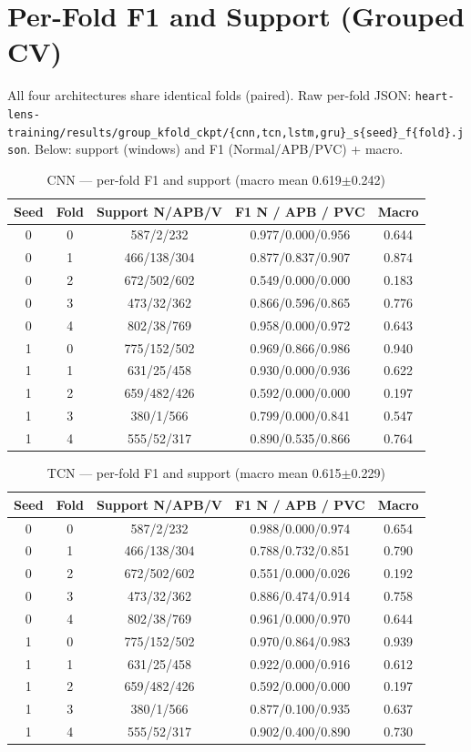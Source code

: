 \documentclass[10pt, conference, letterpaper]{IEEEtran}
\begin{document}
\section{Per-Fold F1 and Support (Grouped CV)}
All four architectures share identical folds (paired). Raw per-fold JSON: \texttt{heart-lens-training/results/group\_kfold\_ckpt/\{cnn,tcn,lstm,gru\}\_s\{seed\}\_f\{fold\}.json}. Below: support (windows) and F1 (Normal/APB/PVC) + macro.

\begin{table}[h]
\centering
\caption{CNN --- per-fold F1 and support (macro mean 0.619$\pm$0.242)}
\label{tab:supp-cnn}
\footnotesize
\begin{tabular}{cc c c c}
\toprule
Seed & Fold & Support N/APB/V & F1 N / APB / PVC & Macro\\
\midrule
0&0&587/2/232&0.977/0.000/0.956&0.644\\
0&1&466/138/304&0.877/0.837/0.907&0.874\\
0&2&672/502/602&0.549/0.000/0.000&0.183\\
0&3&473/32/362&0.866/0.596/0.865&0.776\\
0&4&802/38/769&0.958/0.000/0.972&0.643\\
1&0&775/152/502&0.969/0.866/0.986&0.940\\
1&1&631/25/458&0.930/0.000/0.936&0.622\\
1&2&659/482/426&0.592/0.000/0.000&0.197\\
1&3&380/1/566&0.799/0.000/0.841&0.547\\
1&4&555/52/317&0.890/0.535/0.866&0.764\\
\bottomrule
\end{tabular}
\end{table}

\begin{table}[h]
\centering
\caption{TCN --- per-fold F1 and support (macro mean 0.615$\pm$0.229)}
\label{tab:supp-tcn}
\footnotesize
\begin{tabular}{cc c c c}
\toprule
Seed & Fold & Support N/APB/V & F1 N / APB / PVC & Macro\\
\midrule
0&0&587/2/232&0.988/0.000/0.974&0.654\\
0&1&466/138/304&0.788/0.732/0.851&0.790\\
0&2&672/502/602&0.551/0.000/0.026&0.192\\
0&3&473/32/362&0.886/0.474/0.914&0.758\\
0&4&802/38/769&0.961/0.000/0.970&0.644\\
1&0&775/152/502&0.970/0.864/0.983&0.939\\
1&1&631/25/458&0.922/0.000/0.916&0.612\\
1&2&659/482/426&0.592/0.000/0.000&0.197\\
1&3&380/1/566&0.877/0.100/0.935&0.637\\
1&4&555/52/317&0.902/0.400/0.890&0.730\\
\bottomrule
\end{tabular}
\end{table}
\end{document}
